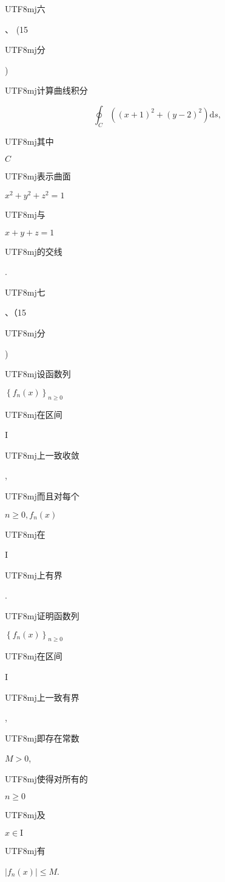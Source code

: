 \documentclass[10pt]{article}
\begin{document}
\begin{CJK}{UTF8}{mj}六\end{CJK}、 (15 \begin{CJK}{UTF8}{mj}分\end{CJK}) \begin{CJK}{UTF8}{mj}计算曲线积分\end{CJK}
$$
\oint_{C}\left((x+1)^{2}+(y-2)^{2}\right) \mathrm{d} s,
$$
\begin{CJK}{UTF8}{mj}其中\end{CJK} $C$ \begin{CJK}{UTF8}{mj}表示曲面\end{CJK} $x^{2}+y^{2}+z^{2}=1$ \begin{CJK}{UTF8}{mj}与\end{CJK} $x+y+z=1$ \begin{CJK}{UTF8}{mj}的交线\end{CJK}.

\begin{CJK}{UTF8}{mj}七\end{CJK}、（15 \begin{CJK}{UTF8}{mj}分\end{CJK}) \begin{CJK}{UTF8}{mj}设函数列\end{CJK} $\left\{f_{n}(x)\right\}_{n \geq 0}$ \begin{CJK}{UTF8}{mj}在区间\end{CJK} I \begin{CJK}{UTF8}{mj}上一致收敛\end{CJK}, \begin{CJK}{UTF8}{mj}而且对每个\end{CJK} $n \geq 0, f_{n}(x)$ \begin{CJK}{UTF8}{mj}在\end{CJK} I \begin{CJK}{UTF8}{mj}上有界\end{CJK}. \begin{CJK}{UTF8}{mj}证明函数列\end{CJK} $\left\{f_{n}(x)\right\}_{n \geq 0}$ \begin{CJK}{UTF8}{mj}在区间\end{CJK} I \begin{CJK}{UTF8}{mj}上一致有界\end{CJK}, \begin{CJK}{UTF8}{mj}即存在常数\end{CJK} $M>0$, \begin{CJK}{UTF8}{mj}使得对所有的\end{CJK} $n \geq 0$ \begin{CJK}{UTF8}{mj}及\end{CJK} $x \in \mathrm{I}$ \begin{CJK}{UTF8}{mj}有\end{CJK} $\left|f_{n}(x)\right| \leq M$.
\end{document}
